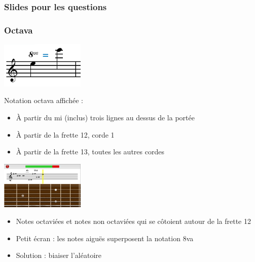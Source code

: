 \documentclass{beamer}
\begin{document}
\date{12 mai 2015}

\begin{frame}
\frametitle{Slides pour les questions}
\end{frame}

\begin{frame}
	\frametitle{Octava}

	\begin{minipage}{0.35\linewidth}
             \includegraphics[width=4cm]{images/octava.png}
        \end{minipage}\hfill
        \begin{minipage}{0.6\linewidth}
             Notation octava affichée :
             \begin{itemize}
 	          \item À partir du mi (inclus) trois lignes au dessus de la portée
                  \item À partir de la frette 12, corde 1
                                         \item À partir de la frette 13, toutes les autres cordes
       	     \end{itemize}
         \end{minipage}

\bigbreak
	\begin{minipage}{0.35\linewidth}
             \includegraphics[width=4cm]{images/portee_frette_12.png}
                  \end{minipage}\hfill
                  \begin{minipage}{0.6\linewidth}
                       \begin{itemize}
                            \item Notes octaviées et notes non octaviées qui se côtoient autour de la frette 12
			    \item Petit écran : les notes aiguës superposent la notation 8va
                            \item Solution : biaiser l'aléatoire
                        \end{itemize}
                   \end{minipage}

\end{frame} 
\end{document}
